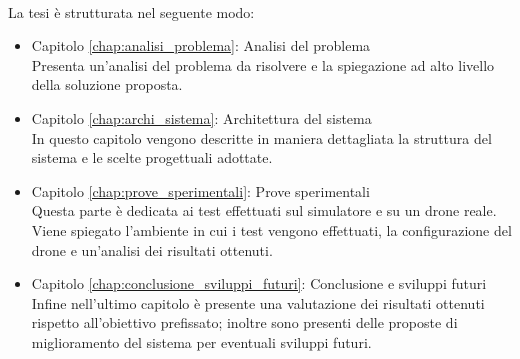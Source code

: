 \\
La tesi è strutturata nel seguente modo:
\begin{itemize}
	\item Capitolo \ref{chap:analisi_problema}: Analisi del problema\\
	Presenta un'analisi del problema da risolvere e la spiegazione ad alto livello della soluzione proposta.
	
	\item Capitolo \ref{chap:archi_sistema}: Architettura del sistema\\
	In questo capitolo vengono descritte in maniera dettagliata la struttura del sistema e le scelte progettuali adottate.
	
	\item Capitolo \ref{chap:prove_sperimentali}: Prove sperimentali\\
	Questa parte è dedicata ai test effettuati sul simulatore e su un drone reale. Viene spiegato l'ambiente in cui i test vengono effettuati, la configurazione del drone e un'analisi dei risultati ottenuti.
	
	\item Capitolo \ref{chap:conclusione_sviluppi_futuri}: Conclusione e sviluppi futuri\\
	Infine nell'ultimo capitolo è presente una valutazione dei risultati ottenuti rispetto all'obiettivo prefissato; inoltre sono presenti delle proposte di miglioramento del sistema per eventuali sviluppi futuri.
\end{itemize}
